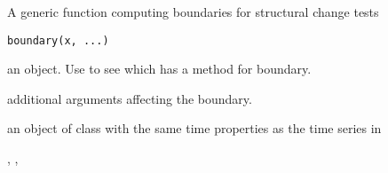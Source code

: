 \begin{Description}\relax
A generic function computing boundaries for structural change
tests\end{Description}
\begin{Usage}
\begin{verbatim}
boundary(x, ...)\end{verbatim}
\end{Usage}
\begin{Arguments}
\begin{ldescription}
\item[\code{x}] an object. Use  to see which
 has a method for boundary.
\item[\code{...}] additional arguments affecting the boundary.
\end{ldescription}
\end{Arguments}
\begin{Value}
an object of class  with the same time properties as
the time series in \end{Value}
\begin{SeeAlso}\relax
{}, ,
\end{SeeAlso}

